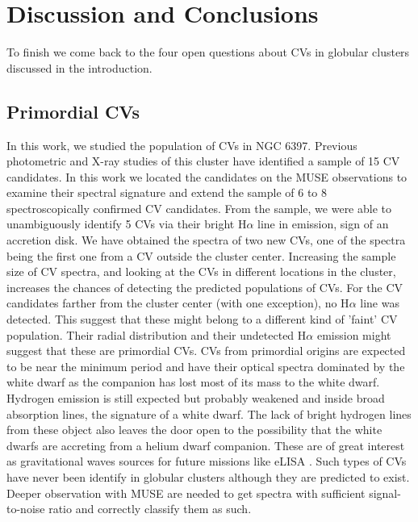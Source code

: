 \chapter{Discussion and Conclusions}\label{chap:conclu}
\thispagestyle{fancy}

To finish we come back to the four open questions about CVs in globular clusters discussed in the introduction. 


\section{Primordial CVs}

In this work, we studied the population of CVs in NGC 6397. Previous photometric and X-ray studies of this cluster have identified a sample of 15 CV candidates. In this work we located the candidates on the MUSE observations to examine their spectral signature and extend the sample of 6 to 8 spectroscopically confirmed CV candidates. From the sample, we were able to unambiguously identify 5 CVs via their bright H$\alpha$ line in emission, sign of an accretion disk. We have obtained the spectra of two new CVs, one of the spectra being the first one from a CV outside the cluster center. Increasing the sample size of CV spectra, and looking at the CVs in different locations in the cluster, increases the chances of detecting the predicted populations of CVs. For the CV candidates farther from the cluster center (with one exception), no H$\alpha$ line was detected. This suggest that these might belong to a different kind of 'faint' CV population. Their radial distribution and their undetected H$\alpha$ emission might suggest that these are primordial CVs. CVs from primordial origins are expected to be near the minimum period and have their optical spectra dominated by the white dwarf as the companion has lost most of its mass to the white dwarf. Hydrogen emission is still expected but probably weakened and inside broad absorption lines, the signature of a white dwarf. The lack of bright hydrogen lines from these object also leaves the door open to the possibility that the white dwarfs are accreting from a helium dwarf companion. These are of great interest as gravitational waves sources for future missions like eLISA \citep{elisa2012}. Such types of CVs have never been identify in globular clusters although they are predicted to exist. Deeper observation with MUSE are needed to get spectra with sufficient signal-to-noise ratio and correctly classify them as such. 

